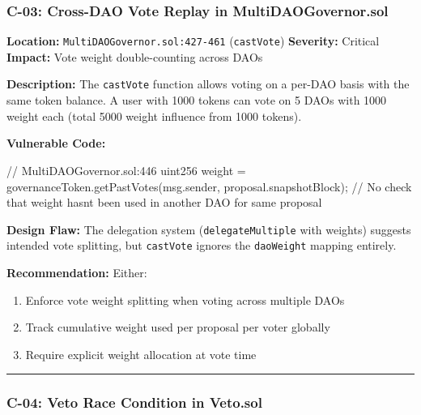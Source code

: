 \documentclass[
]{article}
\newenvironment{Shaded}{}{}
\newcommand{\NormalTok}[1]{#1}
\providecommand{\tightlist}{%
  \setlength{\itemsep}{0pt}\setlength{\parskip}{0pt}}
\begin{document}
\subsubsection{C-03: Cross-DAO Vote Replay in
MultiDAOGovernor.sol}\label{c-03-cross-dao-vote-replay-in-multidaogovernorsol}

\textbf{Location:} \texttt{MultiDAOGovernor.sol:427-461}
(\texttt{castVote}) \textbf{Severity:} Critical \textbf{Impact:} Vote
weight double-counting across DAOs

\textbf{Description:} The \texttt{castVote} function allows voting on a
per-DAO basis with the same token balance. A user with 1000 tokens can
vote on 5 DAOs with 1000 weight each (total 5000 weight influence from
1000 tokens).

\textbf{Vulnerable Code:}

\begin{Shaded}
\begin{Highlighting}[]
\NormalTok{// MultiDAOGovernor.sol:446}
\NormalTok{uint256 weight = governanceToken.getPastVotes(msg.sender, proposal.snapshotBlock);}
\NormalTok{// No check that weight hasn\textquotesingle{}t been used in another DAO for same proposal}
\end{Highlighting}
\end{Shaded}

\textbf{Design Flaw:} The delegation system (\texttt{delegateMultiple}
with weights) suggests intended vote splitting, but \texttt{castVote}
ignores the \texttt{daoWeight} mapping entirely.

\textbf{Recommendation:} Either:

\begin{enumerate}
\def\labelenumi{\arabic{enumi}.}
\tightlist
\item
  Enforce vote weight splitting when voting across multiple DAOs
\item
  Track cumulative weight used per proposal per voter globally
\item
  Require explicit weight allocation at vote time
\end{enumerate}

\begin{center}\rule{0.5\linewidth}{0.5pt}\end{center}

\subsubsection{C-04: Veto Race Condition in
Veto.sol}\label{c-04-veto-race-condition-in-vetosol}
\end{document}
